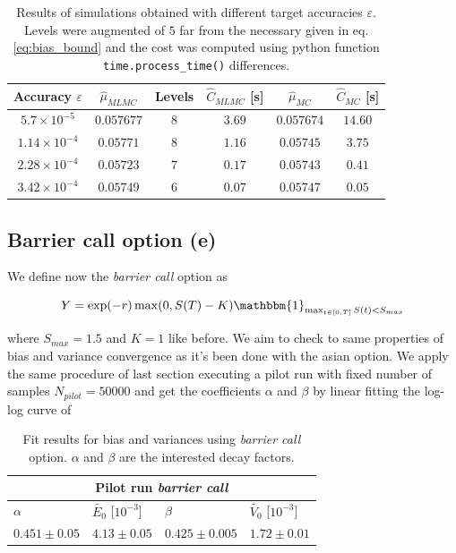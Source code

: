 \begin{table}[h]
\centering
\begin{tabular}{ ||c c c c c c||  }
\hline
Accuracy $\varepsilon$ & $\hat{\mu}_{MLMC}$ & Levels & $\hat{C}_{MLMC}$ [\si{s}] & $\hat{\mu}_{MC}$ & $\hat{C}_{MC}$ [\si{s}]\\ [0.5ex] 
\hline
\hline
$5.7\times10^{-5}$ & $0.057677$ & $8$ & $3.69$ & $0.057674$ & $14.60$ \\
$1.14\times10^{-4}$ & $0.05771$ & $8$ & $1.16$ & $0.05745$ & $3.75$ \\
$2.28\times10^{-4}$ & $0.05723$ & $7$ & $0.17$ & $0.05743$ & $0.41$ \\
$3.42\times10^{-4}$ & $0.05749$ & $6$ & $0.07$ & $0.05747$ & $0.05$\\
\hline
\end{tabular}
\caption{Results of simulations obtained with different target accuracies $\varepsilon$. Levels were augmented of $5$ far from the necessary given in eq. \ref{eq:bias_bound} and the cost was computed using python function \texttt{time.process\_time()} differences.} 
\label{tab:efficiency_results}
\end{table}

\subsection{Barrier call option (e)}

We define now the \textit{barrier call} option as

\begin{equation}\label{eq:barrier_call}
Y = \exp(-r) \max(0, S(T) - K) \mathbbm{1}_{\max_{t\in[0,T]} S(t) < S_{max}}
\end{equation}

where $S_{max} = 1.5$ and $K = 1$ like before.
We aim to check to same properties of bias and variance convergence as it's been done with the asian option.
We apply the same procedure of last section executing a pilot run with fixed number of samples $N_{pilot} = 50000$ and get the coefficients $\alpha$ and $\beta$ by linear fitting the log-log curve of 

\begin{table}[h]
\begin{tabular}{ |p{3cm}|p{3cm}|p{3cm}|p{3cm}|  }
\hline
\multicolumn{4}{|c|}{Pilot run \textit{barrier call}} \\
\hline
$\alpha$ & $\tilde{E_0}$ [$10^{-3}$] & $\beta$ & $\tilde{V_0}$ [$10^{-3}$] \\
$0.451 \pm 0.05$ & $4.13 \pm 0.05$ & $0.425 \pm 0.005$ & $1.72 \pm 0.01$ \\
\hline
\end{tabular}
\caption{Fit results for bias and variances using \textit{barrier call} option. $\alpha$ and $\beta$ are the interested decay factors.}
\label{tab:barrier_call_results}
\end{table}

